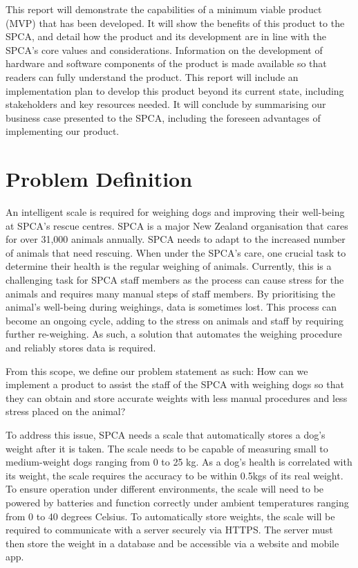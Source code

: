 This report will demonstrate the capabilities of a minimum viable product (MVP) that has been developed. It will show the benefits of this product to the SPCA, and detail how the product and its development are in line with the SPCA's core values and considerations. Information on the development of hardware and software components of the product is made available so that readers can fully understand the product. This report will include an implementation plan to develop this product beyond its current state, including stakeholders and key resources needed. It will conclude by summarising our business case presented to the SPCA, including the foreseen advantages of implementing our product.


\chapter{Problem Definition}
An intelligent scale is required for weighing dogs and improving their well-being at SPCA’s rescue centres. SPCA is a major New Zealand organisation that cares for over 31,000 animals annually. SPCA needs to adapt to the increased number of animals that need rescuing. When under the SPCA’s care, one crucial task to determine their health is the regular weighing of animals. Currently, this is a challenging task for SPCA staff members as the process can cause stress for the animals and requires many manual steps of staff members. By prioritising the animal’s well-being during weighings, data is sometimes lost. This process can become an ongoing cycle, adding to the stress on animals and staff by requiring further re-weighing. As such, a solution that automates the weighing procedure and reliably stores data is required.

From this scope, we define our problem statement as such: How can we implement a product to assist the staff of the SPCA with weighing dogs so that they can obtain and store accurate weights with less manual procedures and less stress placed on the animal?

To address this issue, SPCA needs a scale that automatically stores a dog's weight after it is taken. The scale needs to be capable of measuring small to medium-weight dogs ranging from 0 to 25 kg. As a dog's health is correlated with its weight, the scale requires the accuracy to be within 0.5kgs of its real weight. To ensure operation under different environments, the scale will need to be powered by batteries and function correctly under ambient temperatures ranging from 0 to 40 degrees Celsius. To automatically store weights, the scale will be required to communicate with a server securely via HTTPS. The server must then store the weight in a database and be accessible via a website and mobile app.

